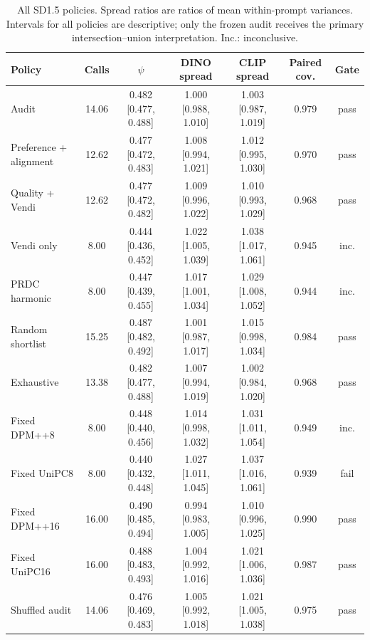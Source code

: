 \begin{table}[t]\centering\small
\caption{All SD1.5 policies. Spread ratios are ratios of mean within-prompt variances. Intervals for all policies are descriptive; only the frozen audit receives the primary intersection--union interpretation. Inc.: inconclusive.}
\begin{tabular}{lcccccc}\toprule
Policy & Calls & $\psi$ & DINO spread & CLIP spread & Paired cov. & Gate \\\midrule
Audit & 14.06 & 0.482 [0.477, 0.488] & 1.000 [0.988, 1.010] & 1.003 [0.987, 1.019] & 0.979 & pass \\
Preference + alignment & 12.62 & 0.477 [0.472, 0.483] & 1.008 [0.994, 1.021] & 1.012 [0.995, 1.030] & 0.970 & pass \\
Quality + Vendi & 12.62 & 0.477 [0.472, 0.482] & 1.009 [0.996, 1.022] & 1.010 [0.993, 1.029] & 0.968 & pass \\
Vendi only & 8.00 & 0.444 [0.436, 0.452] & 1.022 [1.005, 1.039] & 1.038 [1.017, 1.061] & 0.945 & inc. \\
PRDC harmonic & 8.00 & 0.447 [0.439, 0.455] & 1.017 [1.001, 1.034] & 1.029 [1.008, 1.052] & 0.944 & inc. \\
Random shortlist & 15.25 & 0.487 [0.482, 0.492] & 1.001 [0.987, 1.017] & 1.015 [0.998, 1.034] & 0.984 & pass \\
Exhaustive & 13.38 & 0.482 [0.477, 0.488] & 1.007 [0.994, 1.019] & 1.002 [0.984, 1.020] & 0.968 & pass \\
Fixed DPM++8 & 8.00 & 0.448 [0.440, 0.456] & 1.014 [0.998, 1.032] & 1.031 [1.011, 1.054] & 0.949 & inc. \\
Fixed UniPC8 & 8.00 & 0.440 [0.432, 0.448] & 1.027 [1.011, 1.045] & 1.037 [1.016, 1.061] & 0.939 & fail \\
Fixed DPM++16 & 16.00 & 0.490 [0.485, 0.494] & 0.994 [0.983, 1.005] & 1.010 [0.996, 1.025] & 0.990 & pass \\
Fixed UniPC16 & 16.00 & 0.488 [0.483, 0.493] & 1.004 [0.992, 1.016] & 1.021 [1.006, 1.036] & 0.987 & pass \\
Shuffled audit & 14.06 & 0.476 [0.469, 0.483] & 1.005 [0.992, 1.018] & 1.021 [1.005, 1.038] & 0.975 & pass \\
\bottomrule\end{tabular}\end{table}
